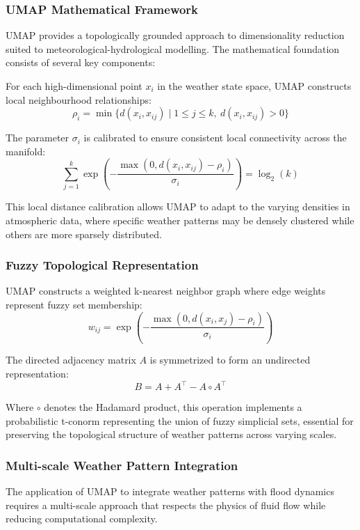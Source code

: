 \documentclass{article}
\begin{document}
\subsubsection{UMAP Mathematical Framework}
UMAP provides a topologically grounded approach to dimensionality reduction suited to meteorological-hydrological modelling. The mathematical foundation consists of several key components:

For each high-dimensional point $x_i$ in the weather state space, UMAP constructs local neighbourhood relationships:
\begin{equation}
\rho_i = \min \{ d(x_i, x_{ij}) \mid 1 \leq j \leq k, \ d(x_i, x_{ij}) > 0 \}
\end{equation}

The parameter $\sigma_i$ is calibrated to ensure consistent local connectivity across the manifold:
\begin{equation}
\sum_{j=1}^k \exp\left(-\frac{\max(0, d(x_i, x_{ij}) - \rho_i)}{\sigma_i}\right) = \log_2(k)
\end{equation}

This local distance calibration allows UMAP to adapt to the varying densities in atmospheric data, where specific weather patterns may be densely clustered while others are more sparsely distributed.

\subsubsection{Fuzzy Topological Representation}
UMAP constructs a weighted k-nearest neighbor graph where edge weights represent fuzzy set membership:
\begin{equation}
w_{ij} = \exp\left(-\frac{\max(0, d(x_i, x_j) - \rho_i)}{\sigma_i}\right)
\end{equation}

The directed adjacency matrix $A$ is symmetrized to form an undirected representation:
\begin{equation}
B = A + A^\top - A \circ A^\top
\end{equation}

Where $\circ$ denotes the Hadamard product, this operation implements a probabilistic t-conorm representing the union of fuzzy simplicial sets, essential for preserving the topological structure of weather patterns across varying scales.

\subsubsection{Multi-scale Weather Pattern Integration}
The application of UMAP to integrate weather patterns with flood dynamics requires a multi-scale approach that respects the physics of fluid flow while reducing computational complexity.
\end{document}
